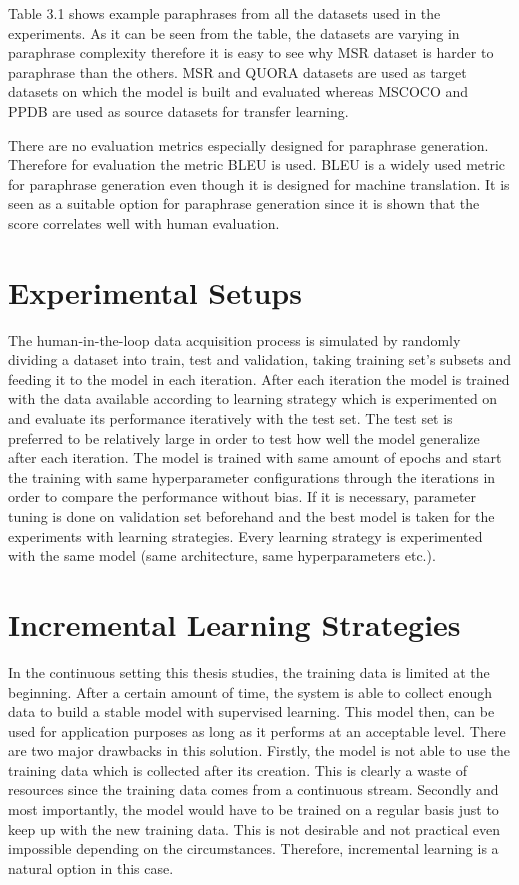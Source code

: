 Table 3.1 shows example paraphrases from all the datasets used in the experiments. As it can be seen from the table, the datasets are varying in paraphrase complexity therefore it is easy to see why MSR dataset is harder to paraphrase than the others. MSR and QUORA datasets are used as target datasets on which the model is built and evaluated whereas MSCOCO and PPDB are used as source datasets for transfer learning.

There are no evaluation metrics especially designed for paraphrase generation. Therefore for evaluation the metric BLEU \cite{Papinenietal}  is used. BLEU is a widely used metric for paraphrase generation even though it is designed for machine translation. It is seen as a suitable option for paraphrase generation since it is shown that the score correlates well with human evaluation.

\section{Experimental Setups}

The human-in-the-loop data acquisition process is simulated by randomly dividing a dataset into train, test and validation, taking training set's subsets and feeding it to the model in each iteration. After each iteration the model is trained with the data available according to learning strategy which is experimented on and evaluate its performance iteratively with the test set. The test set is preferred to be relatively large in order to test how well the model generalize after each iteration. The model is trained with same amount of epochs and start the training with same hyperparameter configurations through the iterations in order to compare the performance without bias. If it is necessary, parameter tuning is done on validation set beforehand and the best model is taken for the experiments with learning strategies. Every learning strategy is experimented with the same model (same architecture, same hyperparameters etc.).

\section{Incremental Learning Strategies}

In the continuous setting this thesis studies, the training data is limited at the beginning. After a certain amount of time, the system is able to collect enough data to build a stable model with supervised learning. This model then, can be used for application purposes as long as it performs at an acceptable level. There are two major drawbacks in this solution. Firstly, the model is not able to use the training data which is collected after its creation. This is clearly a waste of resources since the training data comes from a continuous stream. Secondly and most importantly, the model would have to be trained on a regular basis just to keep up with the new training data. This is not desirable and not practical even impossible depending on the circumstances. Therefore, incremental learning is a natural option in this case.

